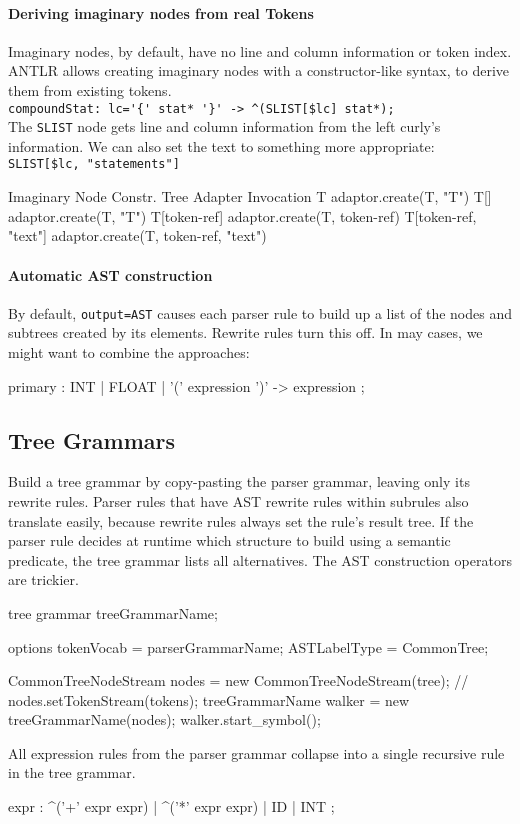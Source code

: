 \paragraph{Deriving imaginary nodes from real Tokens}
Imaginary nodes, by default, have no line and column information
or token index.
ANTLR allows creating imaginary nodes with a constructor-like syntax,
to derive them from existing tokens.\\
\verb|compoundStat: lc='{' stat* '}' -> ^(SLIST[$lc] stat*);|\\
The \verb=SLIST= node gets line and column information
from the left curly's information.
We can also set the text to something more appropriate:\\
\verb=SLIST[$lc, "statements"]=

\begin{verbatimtab}
Imaginary Node Constr.	Tree Adapter Invocation
T			adaptor.create(T, "T")
T[]			adaptor.create(T, "T")
T[token-ref]		adaptor.create(T, token-ref)
T[token-ref, "text"]	adaptor.create(T, token-ref, "text")
\end{verbatimtab}

\paragraph{Automatic AST construction}
By default, \verb-output=AST- causes each parser rule to build up a list
of the nodes and subtrees created by its elements.
Rewrite rules turn this off.
In may cases, we might want to combine the approaches:
\begin{verbatimtab}
primary	: INT
	| FLOAT
	| '(' expression ')' -> expression
	;
\end{verbatimtab}


\subsection{Tree Grammars}

Build a tree grammar by copy-pasting the parser grammar,
leaving only its rewrite rules.
Parser rules that have AST rewrite rules within subrules also translate easily,
because rewrite rules always set the rule's result tree.
If the parser rule decides at runtime which structure to build
using a semantic predicate,
the tree grammar lists all alternatives.
The AST construction operators are trickier.

\begin{verbatimtab}
tree grammar treeGrammarName;

options {
	tokenVocab = parserGrammarName;
	ASTLabelType = CommonTree;
}

CommonTreeNodeStream nodes = new CommonTreeNodeStream(tree);
// nodes.setTokenStream(tokens);
treeGrammarName walker = new treeGrammarName(nodes);
walker.start_symbol();
\end{verbatimtab}

All expression rules from the parser grammar
collapse into a single recursive rule in the tree grammar.
\begin{verbatimtab}
expr	: ^('+' expr expr)
	| ^('*' expr expr)
	| ID
	| INT
	;
\end{verbatimtab}
